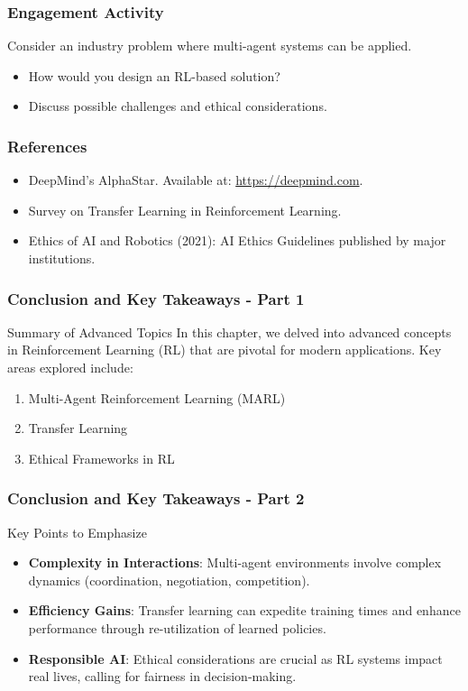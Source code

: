 \documentclass[aspectratio=169]{beamer}
\begin{document}
\begin{frame}[fragile]
    \frametitle{Engagement Activity}
    Consider an industry problem where multi-agent systems can be applied. 
    \begin{itemize}
        \item How would you design an RL-based solution?
        \item Discuss possible challenges and ethical considerations.
    \end{itemize}
\end{frame}

\begin{frame}[fragile]
    \frametitle{References}
    \begin{itemize}
        \item DeepMind's AlphaStar. Available at: \url{https://deepmind.com}.
        \item Survey on Transfer Learning in Reinforcement Learning.
        \item Ethics of AI and Robotics (2021): AI Ethics Guidelines published by major institutions.
    \end{itemize}
\end{frame}

\begin{frame}[fragile]
  \frametitle{Conclusion and Key Takeaways - Part 1}
  \begin{block}{Summary of Advanced Topics}
      In this chapter, we delved into advanced concepts in Reinforcement Learning (RL) that are pivotal for modern applications. Key areas explored include:
  \end{block}

  \begin{enumerate}
      \item Multi-Agent Reinforcement Learning (MARL)
      \item Transfer Learning
      \item Ethical Frameworks in RL
  \end{enumerate}
\end{frame}

\begin{frame}[fragile]
  \frametitle{Conclusion and Key Takeaways - Part 2}
  \begin{block}{Key Points to Emphasize}
      \begin{itemize}
          \item \textbf{Complexity in Interactions}: Multi-agent environments involve complex dynamics (coordination, negotiation, competition).
          \item \textbf{Efficiency Gains}: Transfer learning can expedite training times and enhance performance through re-utilization of learned policies.
          \item \textbf{Responsible AI}: Ethical considerations are crucial as RL systems impact real lives, calling for fairness in decision-making.
      \end{itemize}
  \end{block}
\end{frame}
\end{document}
